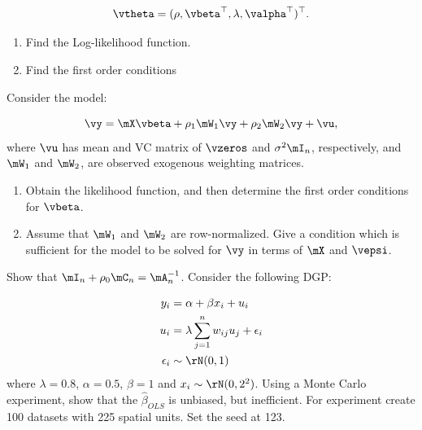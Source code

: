 \begin{exercises}
	\begin{equation}
		\vtheta = (\rho, \vbeta^\top, \lambda, \valpha^\top)^\top.
	\end{equation}
	
   \begin{enumerate}
     \item Find the Log-likelihood function.
     \item Find the first order conditions
   \end{enumerate}
 
 \exercise Consider the model:

\begin{equation}
	\vy = \mX\vbeta + \rho_1\mW_1\vy + \rho_2\mW_2\vy + \vu,
\end{equation}
%
where $\vu$ has mean and VC matrix of $\vzeros$ and $\sigma^2\mI_n$, respectively, and $\mW_1$ and $\mW_2$, are observed exogenous weighting matrices. 
   \begin{enumerate}
    \item Obtain the likelihood function, and then determine the first order conditions for $\vbeta$.
    \item Assume that $\mW_1$ and $\mW_2$ are row-normalized. Give a condition which is sufficient for the model to be solved for $\vy$ in terms of $\mX$ and $\vepsi$.
   \end{enumerate}
   
   \exercise  Show that $\mI_n + \rho_0\mC_n = \mA_n^{-1}$.
   \exercise  Consider the following DGP:

\begin{equation}
	\begin{aligned}
		y_i & = \alpha + \beta x_i + u_i \\
		u_i & = \lambda \sum_{j =  1}^n w_{ij}u_{j} + \epsilon_i \\
		\epsilon_i &\sim \rN(0, 1) 
	\end{aligned}
\end{equation}
%
where $\lambda = 0.8$, $\alpha = 0.5$, $\beta = 1$ and $x_i \sim \rN(0, 2^2)$. Using a Monte Carlo experiment, show that the $\widehat{\beta}_{OLS}$ is unbiased, but inefficient. For experiment create 100 datasets with 225 spatial units. Set the seed at 123.


\end{exercises}   
    
    

